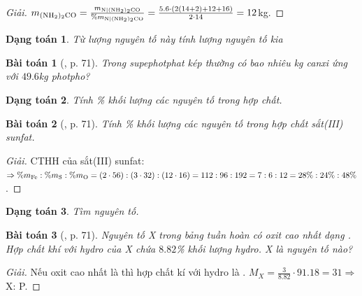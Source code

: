 \documentclass{article}
\newtheorem{baitoan}{Bài toán}
\newtheorem{dangtoan}{Dạng toán}
\begin{document}
\begin{proof}[Giải]
	$m_{\ce{(NH2)2CO}} = \frac{m_{\ce{N|(NH2)2CO}}}{\%m_{\ce{N|(NH2)2CO}}} = \frac{5.6\cdot(2(14 + 2) + 12 + 16)}{2\cdot14} = 12$kg.
\end{proof}

\begin{dangtoan}
	Từ lượng nguyên tố này tính lượng nguyên tố kia
\end{dangtoan}

\begin{baitoan}[\cite{Tuan2022}, p. 71]
	Trong supephotphat kép thường có bao nhiêu kg canxi ứng với $49.6$\emph{kg} photpho?
\end{baitoan}

\begin{dangtoan}
	Tính \% khối lượng các nguyên tố trong hợp chất.
\end{dangtoan}

\begin{baitoan}[\cite{Tuan2022}, p. 71]
	Tính \% khối lượng các nguyên tố trong hợp chất sắt(III) sunfat.
\end{baitoan}

\begin{proof}[Giải]
	{\rm CTHH} của sắt(III) sunfat: $\Rightarrow\%m_{\ce{Fe}}:\%m_{\ce{S}}:\%m_{\ce{O}} = (2\cdot56):(3\cdot32):(12\cdot16) = 112:96:192 = 7:6:12 = 28\%:24\%:48\%$.
\end{proof}

\begin{dangtoan}
	Tìm nguyên tố.
\end{dangtoan}

\begin{baitoan}[\cite{Tuan2022}, p. 71]
	Nguyên tố X trong bảng tuần hoàn có oxit cao nhất dạng \emph{}. Hợp chất khí với hydro của X chứa $8.82$\% khối lượng hydro. X là nguyên tố nào?
\end{baitoan}

\begin{proof}[Giải]
	Nếu oxit cao nhất là  thì hợp chất kí với hydro là . $M_X = \frac{3}{8.82}\cdot91.18 = 31\Rightarrow$ X: P.
\end{proof}


\printbibliography[heading=bibintoc]
\end{document}
